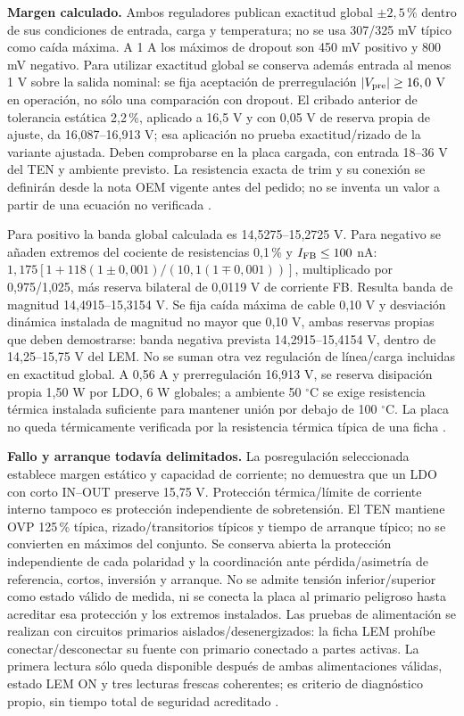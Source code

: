 \textbf{Margen calculado.} Ambos reguladores publican exactitud global $\pm2,5\,\%$ dentro de sus condiciones de entrada, carga y temperatura; no se usa 307/325 mV típico como caída máxima. A 1 A los máximos de dropout son 450 mV positivo y 800 mV negativo. Para utilizar exactitud global se conserva además entrada al menos 1 V sobre la salida nominal: se fija aceptación de prerregulación $|V_{\rm pre}|\ge16,0$ V en operación, no sólo una comparación con dropout. El cribado anterior de tolerancia estática 2,2\,\%, aplicado a 16,5 V y con 0,05 V de reserva propia de ajuste, da 16,087--16,913 V; esa aplicación no prueba exactitud/rizado de la variante ajustada. Deben comprobarse en la placa cargada, con entrada 18--36 V del TEN y ambiente previsto. La resistencia exacta de trim y su conexión se definirán desde la nota OEM vigente antes del pedido; no se inventa un valor a partir de una ecuación no verificada \parencites[pp.~3--4]{lote35-ten30}[p.~6]{lote38-positive}[p.~6]{lote38-negative}.

Para positivo la banda global calculada es 14,5275--15,2725 V. Para negativo se añaden extremos del cociente de resistencias 0,1\,\% y $I_{\rm FB}\le100$ nA: $1,175[1+118(1\pm0,001)/(10,1(1\mp0,001))]$, multiplicado por 0,975/1,025, más reserva bilateral de 0,0119 V de corriente FB. Resulta banda de magnitud 14,4915--15,3154 V. Se fija caída máxima de cable 0,10 V y desviación dinámica instalada de magnitud no mayor que 0,10 V, ambas reservas propias que deben demostrarse: banda negativa prevista 14,2915--15,4154 V, dentro de 14,25--15,75 V del LEM. No se suman otra vez regulación de línea/carga incluidas en exactitud global. A 0,56 A y prerregulación 16,913 V, se reserva disipación propia 1,50 W por LDO, 6 W globales; a ambiente 50 $^\circ$C se exige resistencia térmica instalada suficiente para mantener unión por debajo de 100 $^\circ$C. La placa no queda térmicamente verificada por la resistencia térmica típica de una ficha \parencites[p.~5]{lote35-lem200}[pp.~5--6 y 18]{lote38-positive}[pp.~5--6 y 19]{lote38-negative}.

\textbf{Fallo y arranque todavía delimitados.} La posregulación seleccionada establece margen estático y capacidad de corriente; no demuestra que un LDO con corto IN--OUT preserve 15,75 V. Protección térmica/límite de corriente interno tampoco es protección independiente de sobretensión. El TEN mantiene OVP 125\,\% típica, rizado/transitorios típicos y tiempo de arranque típico; no se convierten en máximos del conjunto. Se conserva abierta la protección independiente de cada polaridad y la coordinación ante pérdida/asimetría de referencia, cortos, inversión y arranque. No se admite tensión inferior/superior como estado válido de medida, ni se conecta la placa al primario peligroso hasta acreditar esa protección y los extremos instalados. Las pruebas de alimentación se realizan con circuitos primarios aislados/desenergizados: la ficha LEM prohíbe conectar/desconectar su fuente con primario conectado a partes activas. La primera lectura sólo queda disponible después de ambas alimentaciones válidas, estado LEM ON y tres lecturas frescas coherentes; es criterio de diagnóstico propio, sin tiempo total de seguridad acreditado \parencites[pp.~2--3 y 10--11]{lote35-lem200}[pp.~3--4]{lote35-ten30}.

